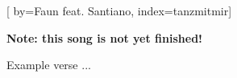 
[%
    by={Faun feat. Santiano},
    index={tanzmitmir}]


    \label{tanzmitmir}

    \textbf{Note: this song is not yet finished!}

    \beginverse
        Example verse ...
    \endverse
\endsong

